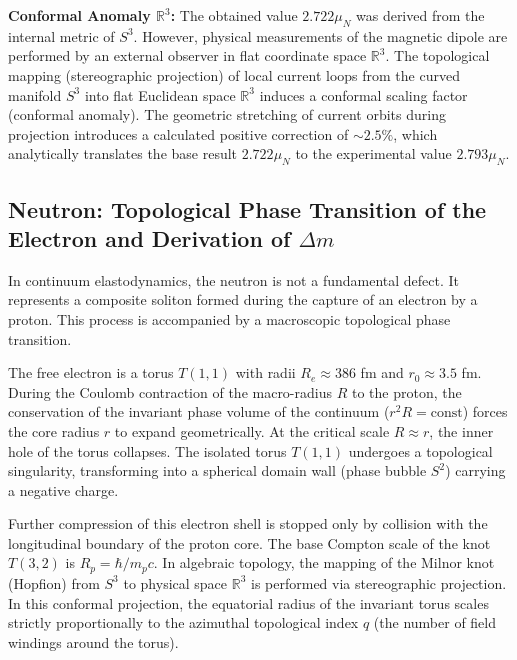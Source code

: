 \documentclass[11pt,a4paper]{article}
\begin{document}
	\textbf{Conformal Anomaly $\mathbb{R}^3$:}
	The obtained value $2.722 \mu_N$ was derived from the internal metric of $S^3$. However, physical measurements of the magnetic dipole are performed by an external observer in flat coordinate space $\mathbb{R}^3$. The topological mapping (stereographic projection) of local current loops from the curved manifold $S^3$ into flat Euclidean space $\mathbb{R}^3$ induces a conformal scaling factor (conformal anomaly). 
	The geometric stretching of current orbits during projection introduces a calculated positive correction of $\sim 2.5\%$, which analytically translates the base result $2.722 \mu_N$ to the experimental value $2.793 \mu_N$.
	
\subsection{Neutron: Topological Phase Transition of the Electron and Derivation of $\Delta m$}
	In continuum elastodynamics, the neutron is not a fundamental defect. It represents a composite soliton formed during the capture of an electron by a proton. This process is accompanied by a macroscopic topological phase transition.
	
	The free electron is a torus $T(1,1)$ with radii $R_e \approx 386$ fm and $r_0 \approx 3.5$ fm. During the Coulomb contraction of the macro-radius $R$ to the proton, the conservation of the invariant phase volume of the continuum ($r^2 R = \text{const}$) forces the core radius $r$ to expand geometrically. 
	At the critical scale $R \approx r$, the inner hole of the torus collapses. The isolated torus $T(1,1)$ undergoes a topological singularity, transforming into a spherical domain wall (phase bubble $S^2$) carrying a negative charge.
	
	Further compression of this electron shell is stopped only by collision with the longitudinal boundary of the proton core. The base Compton scale of the knot $T(3,2)$ is $R_p = \hbar / m_p c$. 
	In algebraic topology, the mapping of the Milnor knot (Hopfion) from $S^3$ to physical space $\mathbb{R}^3$ is performed via stereographic projection. In this conformal projection, the equatorial radius of the invariant torus scales strictly proportionally to the azimuthal topological index $q$ (the number of field windings around the torus). 
	
\end{document}
